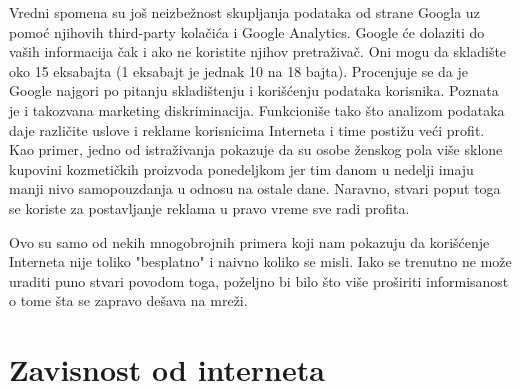 \documentclass[a4paper]{article}
\begin{document}
	Vredni spomena su još neizbežnost skupljanja podataka od strane Googla uz pomoć njihovih third-party kolačića i Google Analytics. Google će dolaziti do vaših informacija čak i ako ne koristite njihov pretraživač. Oni mogu da skladište oko 15 eksabajta (1 eksabajt je jednak 10 na 18 bajta). Procenjuje se da je Google najgori po pitanju skladištenju i korišćenju podataka korisnika. Poznata je i takozvana marketing diskriminacija. Funkcioniše tako što analizom podataka daje različite uslove i reklame korisnicima Interneta i time postižu veći profit. Kao primer, jedno od istraživanja pokazuje da su osobe ženskog pola više sklone kupovini kozmetičkih proizvoda ponedeljkom jer tim danom u nedelji imaju manji nivo samopouzdanja u odnosu na ostale dane. Naravno, stvari poput toga se koriste za postavljanje reklama u pravo vreme sve radi profita. \cite{?}

	Ovo su samo od nekih mnogobrojnih primera koji nam pokazuju da korišćenje Interneta nije toliko "besplatno" i naivno koliko se misli. Iako se trenutno ne može uraditi puno stvari povodom toga, poželjno bi bilo što više proširiti informisanost o tome šta se zapravo dešava na mreži.

\section{Zavisnost od interneta}

\appendix
 

\appendix
\end{document}
